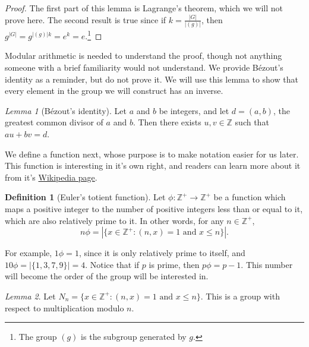 \documentclass[12pt]{article}
\theoremstyle{theorem}
\theoremstyle{theorem}
\theoremstyle{definition}
\newtheorem*{definition*}{Definition}
\theoremstyle{example}
\theoremstyle{remark}
\theoremstyle{propposition}
\theoremstyle{lemma}
\newtheorem*{lemma*}{Lemma}
\begin{document}
\begin{proof}
  The first part of this lemma is Lagrange's theorem, which we will not prove here. The second result is true since if $k=\frac{|G|}{|(g)|}$, then $g^{|G|}=g^{|(g)|k}=e^k=e$.\footnote{The group $(g)$ is the subgroup generated by $g$.}
\end{proof}

Modular arithmetic is needed to understand the proof, though not anything someone with a brief familiarity would not understand. We provide Bézout's identity as a reminder, but do not prove it. We will use this lemma to show that every element in the group we will construct has an inverse.

\begin{lemma*}[Bézout's identity]
  \label{lem:bezouts-identity}
  Let $a$ and $b$ be integers, and let $d=(a,b)$, the greatest common divisor of $a$ and $b$. Then there exists $u,v\in\mathbb{Z}$ such that $au+bv=d$.
\end{lemma*}


We define a function next, whose purpose is to make notation easier for us later. This function is interesting in it's own right, and readers can learn more about it from it's \href{https://en.wikipedia.org/wiki/Euler%27s_totient_function}{Wikipedia page}.

\begin{definition*}[Euler's totient function]
  \label{def:etf}
  Let $\phi: \mathbb{Z}^+\to\mathbb{Z}^+$ be a function which maps a positive integer to the number of positive integers less than or equal to it, which are also relatively prime to it. In other words, for any $n\in\mathbb{Z}^+$, $$n\phi=|\{x\in\mathbb{Z}^+ : (n,x)=1\textrm{ and } x\leq n\}|.$$
\end{definition*}

For example, $1\phi=1$, since it is only relatively prime to itself, and $10\phi=|\{1,3,7,9\}|=4$. Notice that if $p$ is prime, then $p\phi=p-1$. This number will become the order of the group will be interested in.

\begin{lemma*}
  Let $N_n=\{x\in\mathbb{Z}^+: (n,x)=1\textrm{ and } x\leq n\}$. This is a group with respect to multiplication modulo $n$.
\end{lemma*}
\end{document}
